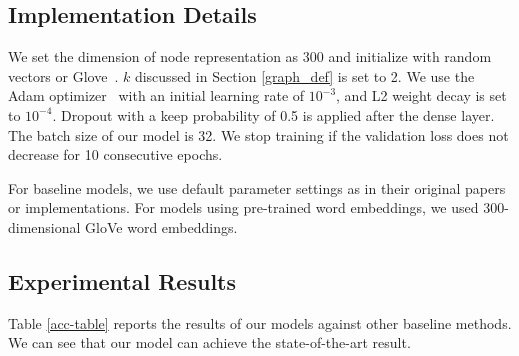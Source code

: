 \documentclass[11pt,a4paper]{article}
\begin{document}
\subsection{Implementation Details}
We set the dimension of node representation as 300 and initialize with random vectors or Glove~\cite{pennington2014glove}. $k$ discussed in Section \ref{graph_def} is set to 2. We use the Adam optimizer~\cite{kingma2014adam} with an initial learning rate of $10^{-3}$, and L2 weight decay is set to $10^{-4}$.  Dropout with a keep probability of 0.5 is applied after the dense layer. The batch size of our model is 32. We stop training if the validation loss does not decrease for 10 consecutive epochs. 

For baseline models, we use default parameter settings as in their original papers or implementations. For models using pre-trained word embeddings, we used 300-dimensional GloVe word embeddings.






\subsection{Experimental Results}

Table \ref{acc-table} reports the results of our models against other baseline methods.
We can see that our model can achieve the state-of-the-art result. 
\begin{table}[t]
\centering
\footnotesize
{}
\caption{\label{tab:datasets} Datasets overview.}
\end{table}
\end{document}
